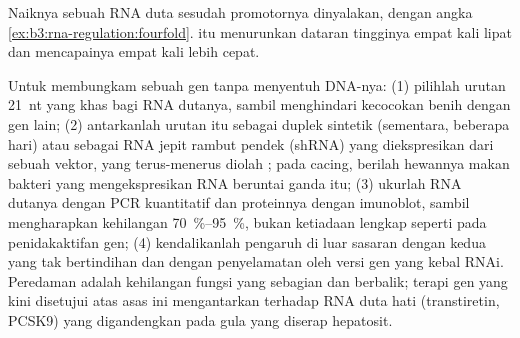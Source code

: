 \begin{omfigure}

{\small Naiknya sebuah RNA duta sesudah promotornya dinyalakan, dengan angka
\cref{ex:b3:rna-regulation:fourfold}.  itu menurunkan
dataran tingginya empat kali lipat dan mencapainya empat kali lebih cepat.}
\end{omfigure}

\begin{method}\label{met:b3:rna-regulation:knockdown}
Untuk membungkam sebuah gen tanpa menyentuh DNA-nya: (1) pilihlah urutan
\qty{21}{nt} yang khas bagi RNA dutanya, sambil menghindari kecocokan benih
dengan gen lain; (2) antarkanlah urutan itu sebagai duplek  sintetik
(sementara, beberapa hari) atau sebagai RNA jepit rambut pendek (shRNA) yang
diekspresikan dari sebuah vektor, yang terus-menerus diolah ; pada
cacing, berilah hewannya makan bakteri yang mengekspresikan RNA beruntai
ganda itu; (3) ukurlah RNA dutanya dengan PCR kuantitatif dan proteinnya
dengan imunoblot, sambil mengharapkan kehilangan \qtyrange{70}{95}{\%}, bukan
ketiadaan lengkap seperti pada penidakaktifan gen; (4) kendalikanlah pengaruh
di luar sasaran dengan  kedua yang tak bertindihan dan dengan penyelamatan
oleh versi gen yang kebal RNAi. Peredaman adalah kehilangan fungsi yang
sebagian dan berbalik; terapi gen yang kini disetujui atas asas ini
mengantarkan  terhadap RNA duta hati (transtiretin, PCSK9) yang
digandengkan pada gula yang diserap hepatosit.
\end{method}

